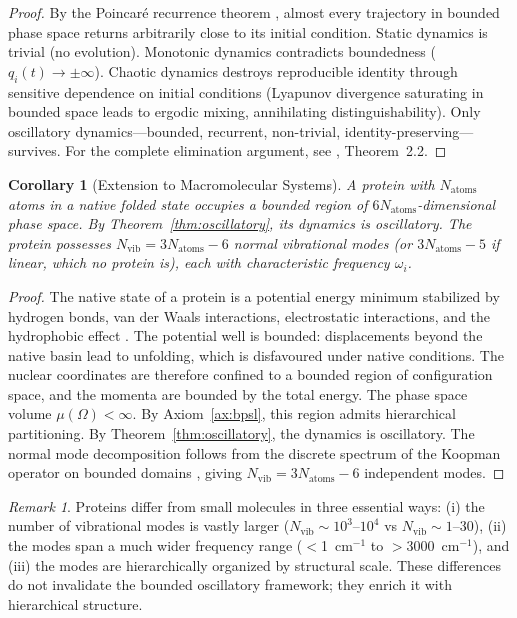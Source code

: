 \documentclass[11pt,twocolumn,a4paper]{article}
\newtheorem{corollary}[theorem]{Corollary}
\theoremstyle{definition}
\theoremstyle{remark}
\newtheorem{remark}[theorem]{Remark}
\newcommand{\Nvib}{N_{\mathrm{vib}}}
\begin{document}
\begin{proof}
By the Poincar\'e recurrence theorem \citep{poincare1890}, almost every trajectory in bounded phase space returns arbitrarily close to its initial condition. Static dynamics is trivial (no evolution). Monotonic dynamics contradicts boundedness ($q_i(t) \to \pm\infty$). Chaotic dynamics destroys reproducible identity through sensitive dependence on initial conditions (Lyapunov divergence saturating in bounded space leads to ergodic mixing, annihilating distinguishability). Only oscillatory dynamics---bounded, recurrent, non-trivial, identity-preserving---survives. For the complete elimination argument, see \citet{sachikonye2025a}, Theorem~2.2.
\end{proof}

\begin{corollary}[Extension to Macromolecular Systems]
\label{cor:macro}
A protein with $N_{\mathrm{atoms}}$ atoms in a native folded state occupies a bounded region of $6N_{\mathrm{atoms}}$-dimensional phase space. By Theorem~\ref{thm:oscillatory}, its dynamics is oscillatory. The protein possesses $\Nvib = 3N_{\mathrm{atoms}} - 6$ normal vibrational modes (or $3N_{\mathrm{atoms}} - 5$ if linear, which no protein is), each with characteristic frequency $\omega_i$.
\end{corollary}

\begin{proof}
The native state of a protein is a potential energy minimum stabilized by hydrogen bonds, van der Waals interactions, electrostatic interactions, and the hydrophobic effect \citep{anfinsen1973, dill2012}. The potential well is bounded: displacements beyond the native basin lead to unfolding, which is disfavoured under native conditions. The nuclear coordinates are therefore confined to a bounded region of configuration space, and the momenta are bounded by the total energy. The phase space volume $\mu(\Omega) < \infty$. By Axiom~\ref{ax:bpsl}, this region admits hierarchical partitioning. By Theorem~\ref{thm:oscillatory}, the dynamics is oscillatory. The normal mode decomposition follows from the discrete spectrum of the Koopman operator on bounded domains \citep{koopman1931}, giving $\Nvib = 3N_{\mathrm{atoms}} - 6$ independent modes.
\end{proof}

\begin{remark}
Proteins differ from small molecules in three essential ways: (i) the number of vibrational modes is vastly larger ($\Nvib \sim 10^3$--$10^4$ vs $\Nvib \sim 1$--$30$), (ii) the modes span a much wider frequency range ($<$1~cm$^{-1}$ to $>$3000~cm$^{-1}$), and (iii) the modes are hierarchically organized by structural scale. These differences do not invalidate the bounded oscillatory framework; they enrich it with hierarchical structure.
\end{remark}
\end{document}
